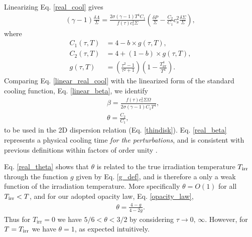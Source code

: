Linearizing Eq. \ref{real_cool} gives   
\begin{align}\label{linear_real_cool}
  (\gamma-1)\frac{\delta\Lambda}{\Sigma} = \frac{2\sigma(\gamma-1)
    T^4C_1}{f(\tau)c_{s}^2\Sigma}\left(\frac{\delta P}{\Sigma} -
  \frac{C_2}{C_1}c_{s}^2\frac{\delta\Sigma}{\Sigma}\right), 
\end{align}
where
\begin{align}
C_1(\tau, T) &= 4 - b\times g(\tau, T),\\ 
C_2(\tau, T) &= 4 + (1-b)\times g(\tau, T),\\ 
  g(\tau, T) &= \left( \frac{\tau^2-1}{\tau^2+1}\right)\left(1 -
  \frac{T_\mathrm{irr}^4}{T^4}\right). \label{g_def}
\end{align}
Comparing Eq. \ref{linear_real_cool} with the linearized form of the
standard cooling function, Eq. \ref{linear_beta}, we identify
\begin{align}
  &\beta = \frac{f(\tau)c_s^2\Sigma\Omega}{2\sigma(\gamma-1)C_1T^4},\label{real_beta}\\
  &\theta = \frac{C_2}{C_1},\label{real_theta} 
\end{align}
to be used in the 2D dispersion relation (Eq. \ref{thindisk}). 
Eq. \ref{real_beta} represents a physical cooling time \emph{for the
  perturbations}, and is consistent with previous definitions within
factors of order unity \citep[e.g.][their Eq. 2]{kratter10}.  

Eq. \ref{real_theta} shows that $\theta$ 
is related to the true irradiation temperature $T_\mathrm{irr}$ through the function $g$ given by 
Eq. \ref{g_def}, and is therefore a only a weak function of the irradiation temperature. 
More specifically $\theta = O(1)$ 
for all $T_\mathrm{irr} <T$, and for our adopted opacity law, Eq. \ref{opacity_law}, 
\begin{align*}
  \theta = \frac{4-g}{4-2g}. 
\end{align*}
Thus for $T_\mathrm{irr} = 0$ we have $5/6<\theta<3/2$ by considering
$\tau\to 0,\,\infty$. However, for $T=T_\mathrm{irr}$ we have $\theta = 1$, as
expected intuitively.    

